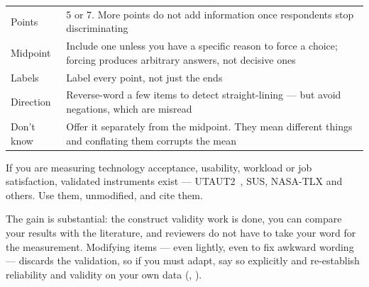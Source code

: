 \begin{center}
\small
\begin{tabular}{@{}L{3.4cm}L{10.9cm}@{}}
\toprule
Points          & 5 or 7. More points do not add information once respondents
                  stop discriminating \\
Midpoint        & Include one unless you have a specific reason to force a
                  choice; forcing produces arbitrary answers, not decisive ones \\
Labels          & Label every point, not just the ends \\
Direction       & Reverse-word a few items to detect straight-lining --- but
                  avoid negations, which are misread \\
Don't know      & Offer it separately from the midpoint. They mean different
                  things and conflating them corrupts the mean \\
\bottomrule
\end{tabular}
\end{center}

\begin{conceptbox}
If you are measuring technology acceptance, usability, workload or job
satisfaction, validated instruments exist --- UTAUT2~\cite{venkatesh2012consumer},
SUS, NASA-TLX and others. Use them, unmodified, and cite them.

\medskip
The gain is substantial: the construct validity work is done, you can compare
your results with the literature, and reviewers do not have to take your word
for the measurement. Modifying items --- even lightly, even to fix awkward
wording --- discards the validation, so if you must adapt, say so explicitly and
re-establish reliability and validity on your own data (,
).
\end{conceptbox}

